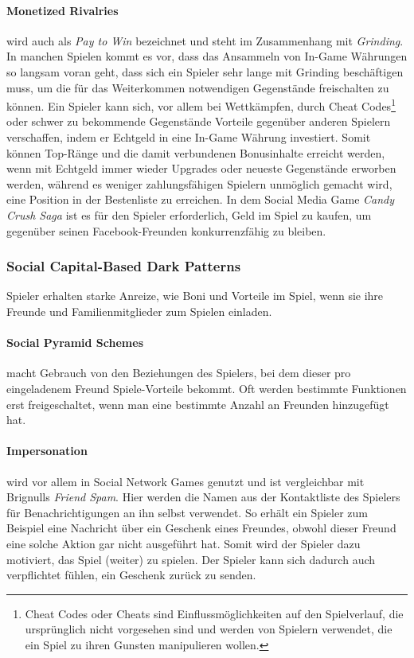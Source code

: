 \documentclass[a4paper]{article}
\begin{document}
\paragraph{Monetized Rivalries} 
\label{para:monetized_rivalries}
wird auch als \textit{Pay to Win} bezeichnet und steht im Zusammenhang mit \textit{Grinding}. In manchen Spielen kommt es vor, dass das Ansammeln von In-Game Währungen so langsam voran geht, dass sich ein Spieler sehr lange mit Grinding beschäftigen muss, um die für das Weiterkommen notwendigen Gegenstände freischalten zu können.\newline
Ein Spieler kann sich, vor allem bei Wettkämpfen, durch Cheat Codes\footnote{\label{foot:11} Cheat Codes oder Cheats sind Einflussmöglichkeiten auf den Spielverlauf, die ursprünglich nicht vorgesehen sind und werden von Spielern verwendet, die ein Spiel zu ihren Gunsten manipulieren wollen.} oder schwer zu bekommende Gegenstände Vorteile gegenüber anderen Spielern verschaffen, indem er Echtgeld in eine In-Game Währung investiert. Somit können Top-Ränge und die damit verbundenen Bonusinhalte erreicht werden, wenn mit Echtgeld immer wieder Upgrades oder neueste Gegenstände erworben werden, während es weniger zahlungsfähigen Spielern unmöglich gemacht wird, eine Position in der Bestenliste zu erreichen.\newline
In dem Social Media Game \textit{Candy Crush Saga} ist es für den Spieler erforderlich, Geld im Spiel zu kaufen, um gegenüber seinen Facebook-Freunden konkurrenzfähig zu bleiben.  

\subsubsection{Social Capital-Based Dark Patterns}
\label{sssec:social_capital_based_dark_patterns}
Spieler erhalten starke Anreize, wie Boni und Vorteile im Spiel, wenn sie ihre Freunde und Familienmitglieder zum Spielen einladen.

\paragraph{Social Pyramid Schemes}
\label{para:social_pyramid_schemes}
macht Gebrauch von den Beziehungen des Spielers, bei dem dieser pro eingeladenem Freund Spiele-Vorteile bekommt. Oft werden bestimmte Funktionen erst freigeschaltet, wenn man eine bestimmte Anzahl an Freunden hinzugefügt hat.

\paragraph{Impersonation}
\label{para:impersonation}
wird vor allem in Social Network Games genutzt und ist vergleichbar mit Brignulls \textit{Friend Spam}. Hier werden die Namen aus der Kontaktliste des Spielers für Benachrichtigungen an ihn selbst verwendet. So erhält ein Spieler zum Beispiel eine Nachricht über ein Geschenk eines Freundes, obwohl dieser Freund eine solche Aktion gar nicht ausgeführt hat. Somit wird der Spieler dazu motiviert, das Spiel (weiter) zu spielen. Der Spieler kann sich dadurch auch verpflichtet fühlen, ein Geschenk zurück zu senden.
\end{document}
